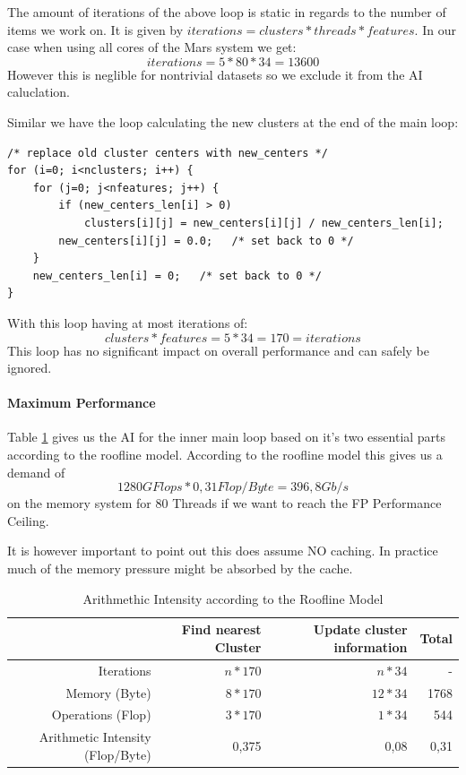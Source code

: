 The amount of iterations of the above loop is static in regards to the number of items we work on.
It is given by $ iterations = clusters * threads * features$.
In our case when using all cores of the Mars system we get: 
$$ iterations = 5 * 80  * 34 = 13600$$
However this is neglible for nontrivial datasets so we exclude it from the AI caluclation.

Similar we have the loop calculating the new clusters at the end of the main loop:
\begin{lstlisting}[caption={Reduction pt2}]
/* replace old cluster centers with new_centers */
for (i=0; i<nclusters; i++) {
	for (j=0; j<nfeatures; j++) {
		if (new_centers_len[i] > 0)
			clusters[i][j] = new_centers[i][j] / new_centers_len[i];
		new_centers[i][j] = 0.0;   /* set back to 0 */
	}
	new_centers_len[i] = 0;   /* set back to 0 */
}
\end{lstlisting}
With this loop having at most iterations of:
$$clusters * features = 5 * 34 = 170 = iterations$$ 
This loop has no significant impact on overall performance and can safely be ignored.

\paragraph{Maximum Performance}

Table \ref{tab:AI} gives us the AI for the inner main loop based on it's two essential parts according to the roofline model.
According to the roofline model this gives us a demand of $$ 1280GFlops * 0,31Flop/Byte = 396,8 Gb/s$$ on the memory system for 80 Threads if
we want to reach the FP Performance Ceiling.

It is however important to point out this does assume NO caching. In practice much of the memory pressure might be absorbed by the cache.

\begin{table}[ht]
	\centering
	\caption{Arithmethic Intensity according to the Roofline Model}
	\label{tab:AI}
	\begin{tabular}{|r|r|r|r|}
		\hline
		& Find nearest Cluster & Update cluster information & Total \\ \hline
		Iterations           & $n * 170$            & $n*34$                     & -     \\ \hline
		Memory (Byte)              & $8*170$              & $12*34$                      & 1768  \\ \hline
		Operations (Flop)          & $3*170$              & $1*34$                       & 544   \\ \hline
		Arithmetic Intensity (Flop/Byte) & 0,375                & 0,08                       & 0,31  \\ \hline
	\end{tabular}
\end{table}

